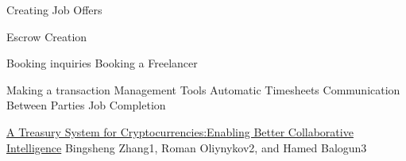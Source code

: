 \documentclass{article}
\begin{document}
Creating Job Offers



Escrow Creation

Booking inquiries
Booking a Freelancer

Making a transaction
Management Tools
Automatic Timesheets
Communication Between Parties
Job Completion


\begin{thebibliography}{99}

\href{https://www.lancaster.ac.uk/staff/zhangb2/treasury.pdf}{A Treasury System for Cryptocurrencies:Enabling Better Collaborative Intelligence}
Bingsheng Zhang1, Roman Oliynykov2, and Hamed Balogun3

\end{thebibliography}
\end{document}
